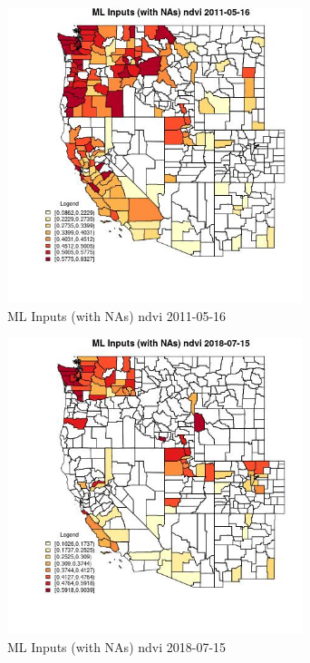 \begin{figure} 
\centering  
\includegraphics[width=0.77\textwidth]{Code_Outputs/Report_ML_input_PM25_Step4_part_e_de_duplicated_aves_compiled_2019-05-20wNAs_CountyndviMean2011-05-16.jpg} 
\caption{\label{fig:Report_ML_input_PM25_Step4_part_e_de_duplicated_aves_compiled_2019-05-20wNAsCountyndviMean2011-05-16}ML Inputs (with NAs) ndvi 2011-05-16} 
\end{figure} 
 

\begin{figure} 
\centering  
\includegraphics[width=0.77\textwidth]{Code_Outputs/Report_ML_input_PM25_Step4_part_e_de_duplicated_aves_compiled_2019-05-20wNAs_CountyndviMean2018-07-15.jpg} 
\caption{\label{fig:Report_ML_input_PM25_Step4_part_e_de_duplicated_aves_compiled_2019-05-20wNAsCountyndviMean2018-07-15}ML Inputs (with NAs) ndvi 2018-07-15} 
\end{figure} 
 

